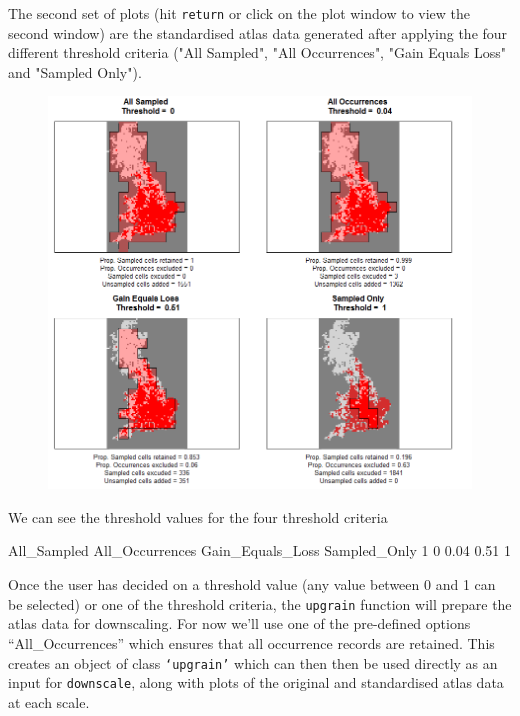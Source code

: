 \documentclass{article}[12pt, a4paper]
\begin{document}
The second set of plots (hit \texttt{return} or click on the plot window to view the second window) are the standardised atlas data generated after applying the four different threshold criteria ("All Sampled",  "All Occurrences",  "Gain Equals Loss" and "Sampled Only").

\begin{figure}[!h]
\centering
\includegraphics[width=12cm]{Threshold_maps.png}
\end{figure}

We can see the threshold values for the four threshold criteria

\begin{Schunk}
\begin{Soutput}
  All_Sampled All_Occurrences Gain_Equals_Loss Sampled_Only
1           0            0.04             0.51            1
\end{Soutput}
\end{Schunk}

Once the user has decided on a threshold value (any value between 0 and 1 can be selected) or one of the threshold criteria, the \texttt{upgrain} function will prepare the atlas data for downscaling. For now we’ll use one of the pre-defined options “All\_Occurrences” which ensures that all occurrence records are retained. This creates an object of class \texttt{‘upgrain’} which can then then be used directly as an input for \texttt{downscale}, along with plots of the original and standardised atlas data at each scale.
\end{document}
